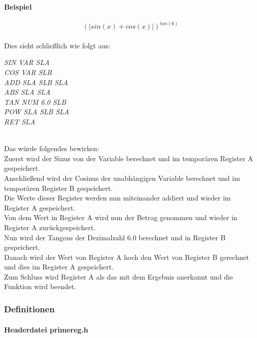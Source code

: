 \documentclass[a4paper,12pt]{article}
\begin{document}
\paragraph{Beispiel}
\[(|sin(x) + cos(x)|)^{tan(6)}\]\\

\noindent Dies sieht schließlich wie folgt aus:

\noindent 
\begin{center}
\textit{
SIN VAR SLA\\ COS VAR SLB \\
ADD SLA SLB SLA\\
ABS SLA SLA\\
TAN NUM 6.0 SLB\\
POW SLA SLB SLA\\
RET SLA
}
\end{center}

\noindent \\ Das würde folgendes bewirken:\\
Zuerst wird der Sinus von der Variable berechnet und im temporären Register A gespeichert.\\
Anschließend wird der Cosinus der unabhängigen Variable berechnet und im temporären Register B gespeichert.\\
Die Werte dieser Register werden nun miteinander addiert und wieder im Register A gespeichert. \\
Von dem Wert in Register A wird nun der Betrag genommen und wieder in Register A zurückgespeichert. \\
Nun wird der Tangens der Dezimalzahl 6.0 berechnet und in Register B gespeichert. \\
Danach wird der Wert von Register A hoch den Wert von Register B gerechnet und dies im Register A gespeichert. \\
Zum Schluss wird Register A als das mit dem Ergebnis anerkannt und die Funktion wird beendet. 

\newpage
\subsubsection{Definitionen}
\paragraph{Headerdatei primereg.h}
\end{document}
